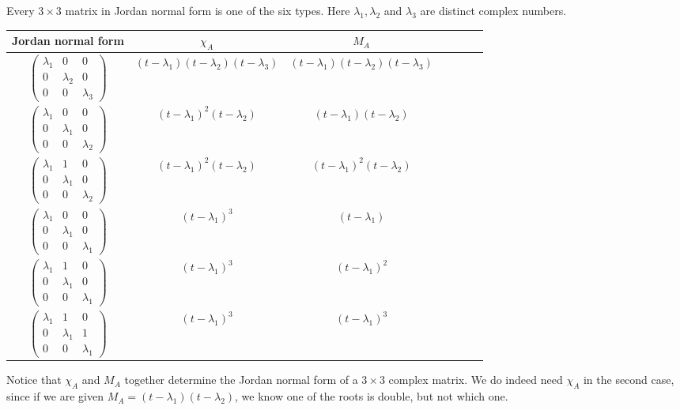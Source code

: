 \documentclass[a4paper]{article}
\begin{document}
\begin{eg}
  Every $3\times 3$ matrix in Jordan normal form is one of the six types. Here $\lambda_1, \lambda_2$ and $\lambda_3$ are distinct complex numbers.
  \begin{center}
    \begin{tabular}{ccccccc}
      \toprule
      Jordan normal form & $\chi_A$ & $M_A$\\
      \midrule
      $\begin{pmatrix} \lambda_1 & 0 & 0\\ 0 & \lambda_2 & 0\\ 0 & 0 & \lambda_3 \end{pmatrix}$ & $(t - \lambda_1)(t - \lambda_2)(t- \lambda_3)$ & $(t - \lambda_1)(t - \lambda_2)(t- \lambda_3)$\\\addlinespace
      $\begin{pmatrix} \lambda_1 & 0 & 0\\ 0 & \lambda_1 & 0\\ 0 & 0 & \lambda_2 \end{pmatrix}$ & $(t - \lambda_1)^2 (t - \lambda_2)$ & $(t - \lambda_1) (t - \lambda_2)$\\\addlinespace
      $\begin{pmatrix} \lambda_1 & 1 & 0\\ 0 & \lambda_1 & 0\\ 0 & 0 & \lambda_2 \end{pmatrix}$ & $(t - \lambda_1)^2 (t - \lambda_2)$ & $(t - \lambda_1)^2 (t - \lambda_2)$\\\addlinespace
      $\begin{pmatrix} \lambda_1 & 0 & 0\\ 0 & \lambda_1 & 0\\ 0 & 0 & \lambda_1 \end{pmatrix}$ & $(t - \lambda_1)^3$ & $(t - \lambda_1)$\\\addlinespace
      $\begin{pmatrix} \lambda_1 & 1 & 0\\ 0 & \lambda_1 & 0\\ 0 & 0 & \lambda_1 \end{pmatrix}$ & $(t - \lambda_1)^3$ & $(t - \lambda_1)^2$\\\addlinespace
      $\begin{pmatrix} \lambda_1 & 1 & 0\\ 0 & \lambda_1 & 1\\ 0 & 0 & \lambda_1 \end{pmatrix}$ & $(t - \lambda_1)^3$ & $(t - \lambda_1)^3$\\
      \bottomrule
    \end{tabular}
  \end{center}
  Notice that $\chi_A$ and $M_A$ together determine the Jordan normal form of a $3\times 3$ complex matrix. We do indeed need $\chi_A$ in the second case, since if we are given $M_A = (t - \lambda_1)(t - \lambda_2)$, we know one of the roots is double, but not which one.
\end{eg}
\end{document}
